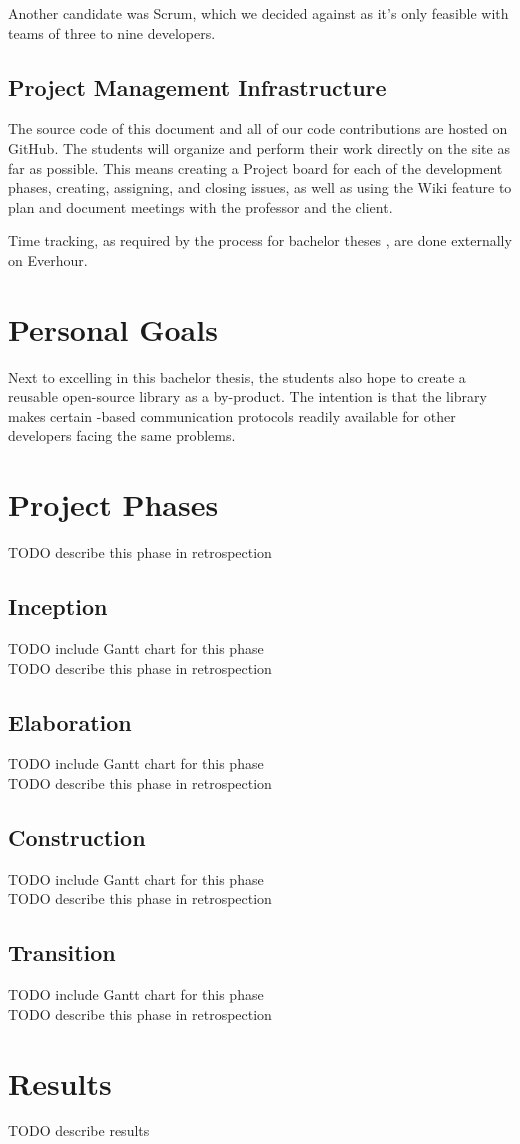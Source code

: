 Another candidate was Scrum, which we decided against as it’s only feasible
with teams of three to nine developers.

\subsection{Project Management Infrastructure}
The source code of this document and all of our code contributions are hosted
on GitHub. The students will organize and perform their work directly on the
site as far as possible. This means creating a Project board for each of the
development phases, creating, assigning, and closing issues, as well as using
the Wiki feature to plan and document meetings with the professor and the
client.

Time tracking, as required by the process for bachelor theses
\cite{hsr:thesis-rules}, are done externally on Everhour.

\section*{Personal Goals}
Next to excelling in this bachelor thesis, the students also hope to create a
reusable open-source library as a by-product. The intention is that the library
makes certain \zmq-based communication protocols readily available for other
developers facing the same problems.

\section*{Project Phases}
TODO describe this phase in retrospection\\

\subsection*{Inception}
TODO include Gantt chart for this phase\\
TODO describe this phase in retrospection\\

\subsection*{Elaboration}
TODO include Gantt chart for this phase\\
TODO describe this phase in retrospection\\

\subsection*{Construction}
TODO include Gantt chart for this phase\\
TODO describe this phase in retrospection\\

\subsection*{Transition}
TODO include Gantt chart for this phase\\
TODO describe this phase in retrospection\\

\section*{Results}
TODO describe results\\
